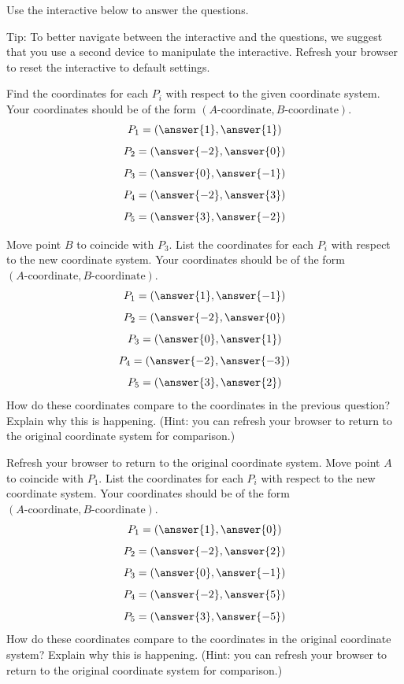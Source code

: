 \documentclass{ximera}
\begin{document}
\begin{exploration}\label{exp:coordSystemLinCombs1}
Use the interactive below to answer the questions.  

Tip: To better navigate between the interactive and the questions, we suggest that you use a second device to manipulate the interactive.  Refresh your browser to reset the interactive to default settings.
\begin{center}
\end{center}
\begin{question}
    Find the coordinates for each $P_i$ with respect to the given coordinate system.  Your coordinates should be of the form $(A\text{-coordinate}, B\text{-coordinate})$.
    $$P_1=\left(\answer{1},\answer{1}\right)$$
    $$P_2=\left(\answer{-2},\answer{0}\right)$$
    $$P_3=\left(\answer{0},\answer{-1}\right)$$
    $$P_4=\left(\answer{-2},\answer{3}\right)$$
    $$P_5=\left(\answer{3},\answer{-2}\right)$$
\end{question}

\begin{question}
Move point $B$ to coincide with $P_3$.
    List the coordinates for each $P_i$ with respect to the new coordinate system.  Your coordinates should be of the form $(A\text{-coordinate}, B\text{-coordinate})$.
    $$P_1=\left(\answer{1},\answer{-1}\right)$$
    $$P_2=\left(\answer{-2},\answer{0}\right)$$
    $$P_3=\left(\answer{0},\answer{1}\right)$$
    $$P_4=\left(\answer{-2},\answer{-3}\right)$$
    $$P_5=\left(\answer{3},\answer{2}\right)$$
    How do these coordinates compare to the coordinates in the previous question?  Explain why this is happening. (Hint: you can refresh your browser to return to the original coordinate system for comparison.)
\end{question}

\begin{question}
Refresh your browser to return to the original coordinate system.  Move point $A$ to coincide with $P_1$.
    List the coordinates for each $P_i$ with respect to the new coordinate system.  Your coordinates should be of the form $(A\text{-coordinate}, B\text{-coordinate})$.
    $$P_1=\left(\answer{1},\answer{0}\right)$$
    $$P_2=\left(\answer{-2},\answer{2}\right)$$
    $$P_3=\left(\answer{0},\answer{-1}\right)$$
    $$P_4=\left(\answer{-2},\answer{5}\right)$$
    $$P_5=\left(\answer{3},\answer{-5}\right)$$
    How do these coordinates compare to the coordinates in the original coordinate system?  Explain why this is happening. (Hint: you can refresh your browser to return to the original coordinate system for comparison.)
\end{question}


\end{exploration}
\end{document}
